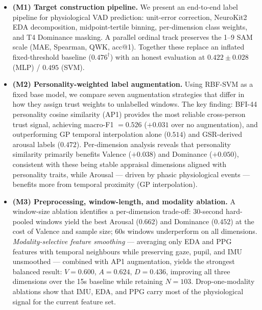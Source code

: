 \documentclass[sigconf,review,anonymous]{acmart}
\begin{document}
\begin{itemize}[leftmargin=1.2em,topsep=2pt,itemsep=1pt]

  \item \textbf{(M1) Target construction pipeline.}
    We present an end-to-end label pipeline for physiological VAD prediction:
    unit-error correction, NeuroKit2 EDA decomposition, midpoint-tertile
    binning, per-dimension class weights, and T4 Dominance masking.
    A parallel ordinal track preserves the 1--9 SAM scale (MAE, Spearman,
    QWK, acc@1).
    Together these replace an inflated fixed-threshold baseline
    ($0.476^\dagger$) with an honest evaluation at $0.422 \pm 0.028$
    (MLP) / $0.495$ (SVM).

  \item \textbf{(M2) Personality-weighted label augmentation.}
    Using RBF-SVM as a fixed base model, we compare seven augmentation
    strategies that differ in how they assign trust weights to unlabelled
    windows.
    The key finding: BFI-44 personality cosine similarity (AP1) provides
    the most reliable cross-person trust signal, achieving macro-F1 $= 0.526$
    ($+0.031$ over no augmentation), and outperforming GP temporal
    interpolation alone ($0.514$) and GSR-derived arousal labels ($0.472$).
    Per-dimension analysis reveals that personality similarity primarily
    benefits Valence ($+0.038$) and Dominance ($+0.050$), consistent with
    these being stable appraisal dimensions aligned with personality traits,
    while Arousal --- driven by phasic physiological events --- benefits more
    from temporal proximity (GP interpolation).

  \item \textbf{(M3) Preprocessing, window-length, and modality ablation.}
    A window-size ablation identifies a per-dimension trade-off:
    30-second hard-pooled windows yield the best Arousal ($0.662$) and
    Dominance ($0.452$) at the cost of Valence and sample size;
    60s windows underperform on all dimensions.
    \emph{Modality-selective feature smoothing} --- averaging only EDA and
    PPG features with temporal neighbours while preserving gaze, pupil, and
    IMU unsmoothed --- combined with AP1 augmentation, yields the strongest
    balanced result: $V{=}0.600$, $A{=}0.624$, $D{=}0.436$, improving all
    three dimensions over the 15s baseline while retaining $N{=}103$.
    Drop-one-modality ablations show that IMU, EDA, and PPG carry most of
    the physiological signal for the current feature set.


\end{itemize}
\end{document}
